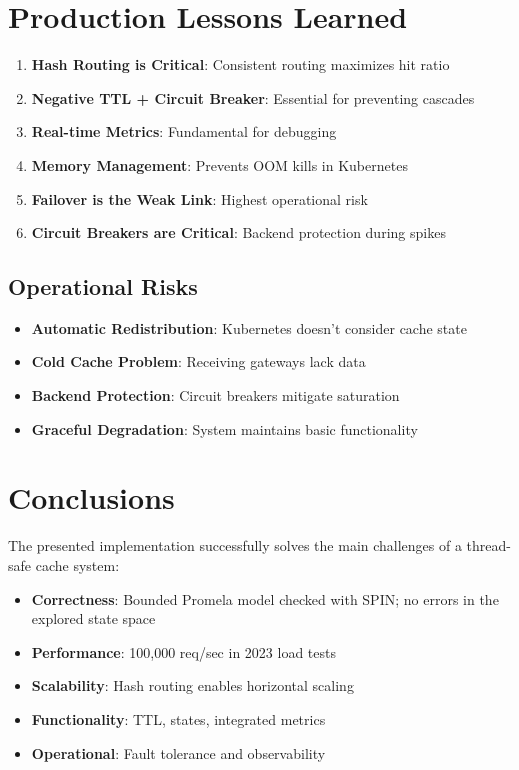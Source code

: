 \documentclass[11pt,a4paper]{article}
\begin{document}
\section{Production Lessons Learned}

\begin{enumerate}
\item \textbf{Hash Routing is Critical}: Consistent routing maximizes hit ratio
\item \textbf{Negative TTL + Circuit Breaker}: Essential for preventing cascades
\item \textbf{Real-time Metrics}: Fundamental for debugging
\item \textbf{Memory Management}: Prevents OOM kills in Kubernetes
\item \textbf{Failover is the Weak Link}: Highest operational risk
\item \textbf{Circuit Breakers are Critical}: Backend protection during spikes
\end{enumerate}

\subsection{Operational Risks}

\begin{itemize}
\item \textbf{Automatic Redistribution}: Kubernetes doesn't consider cache state
\item \textbf{Cold Cache Problem}: Receiving gateways lack data  
\item \textbf{Backend Protection}: Circuit breakers mitigate saturation
\item \textbf{Graceful Degradation}: System maintains basic functionality
\end{itemize}

\section{Conclusions}

The presented implementation successfully solves the main challenges of
a thread-safe cache system:

\begin{itemize}
\item \textbf{Correctness}: Bounded Promela model checked with SPIN; no errors in the explored state space
\item \textbf{Performance}: 100,000 req/sec in 2023 load tests
\item \textbf{Scalability}: Hash routing enables horizontal scaling
\item \textbf{Functionality}: TTL, states, integrated metrics
\item \textbf{Operational}: Fault tolerance and observability
\end{itemize}
\end{document}
